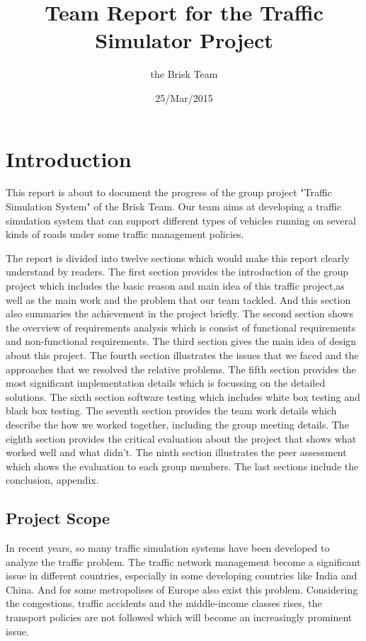 \documentclass[12pt]{amsart}
\title{Team Report for the Traffic Simulator Project}
\author{the Brisk Team}
\date{25/Mar/2015}
\begin{document}
\maketitle
\tableofcontents

\clearpage

\section{Introduction}
This report is about to document the progress of the group project "Traffic Simulation System" of the Brisk Team. Our team aims at developing a traffic simulation system that can support different types of vehicles running on several kinds of roads under some traffic management policies.

The report is divided into twelve sections which would make this report clearly understand by readers. The first section provides the introduction of the group project which includes the basic reason and main idea of this traffic project,as well as the main work and the problem that our team tackled. And this section also summaries the achievement in the project briefly. The second section shows the overview of requirements analysis which is consist of functional requirements and non-functional requirements. The third section gives the main idea of design about this project. The fourth section illustrates the issues that we faced and the approaches that we resolved the relative problems. The fifth section provides the most significant implementation details which is focussing on the detailed solutions. The sixth section software testing which includes white box testing and black box testing. The seventh section provides the team work details which describe the how we worked together, including the group meeting details. The eighth section provides the critical evaluation about the project that shows what worked well and what didn't. The ninth section illustrates the peer assessment which shows the evaluation to each group members. The last sections include the conclusion, appendix.

\subsection{Project Scope}

In recent years, so many traffic simulation systems have been developed to analyze the traffic problem. The traffic network management become a significant issue in different countries, especially in some developing countries like India and China. And for some metropolises of Europe also exist this problem. Considering the congestions, traffic accidents and the middle-income classes rises, the transport policies are not followed which will become an increasingly prominent issue.
\end{document}

